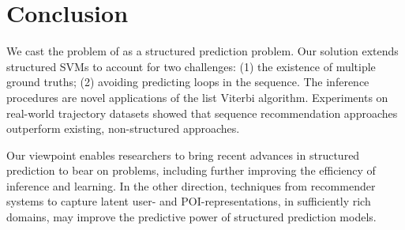 
\section{Conclusion}

We cast the problem of {\trajrec}
as a structured prediction problem.
Our solution extends structured SVMs to account for two challenges:
(1) the existence of multiple ground truths;
(2) avoiding predicting loops in the sequence.
The inference procedures are novel applications of the list Viterbi algorithm.
Experiments on real-world trajectory datasets showed that
sequence recommendation approaches outperform existing, non-structured approaches.

Our viewpoint enables researchers to bring recent advances in structured prediction
to bear on {\trajrec} problems,
including further improving the efficiency of inference and learning.
In the other direction, techniques from recommender systems to capture latent
user- and POI-representations, in sufficiently rich domains, may
improve the predictive power of structured prediction models.

